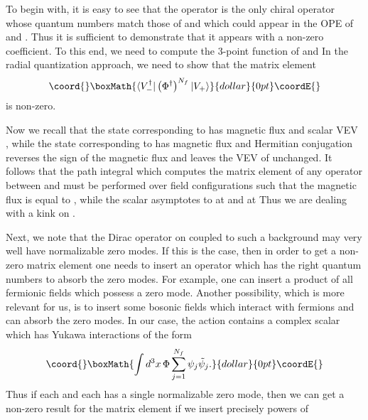 \documentclass[a4paper,12pt, amsfonts, amssymb]{article}
\providecommand{\RR}{{\mathbb R}}
\renewcommand{\SS}{{\mathbb S}}
\providecommand{\tpsi}{{\tilde \psi}}
\begin{document}
To begin with, it is easy to see that the operator \coordHE{} is the
only chiral operator whose quantum numbers match those of \coordHE{}
and which could appear in the OPE of \coordHE{} and \coordHE{}.
Thus it is sufficient to demonstrate that it appears with a non-zero
coefficient. To this end, we need to compute the 3-point function
of \coordHE{} and \coordHE{} In the radial
quantization approach, we need to show that the matrix element
$$\coord{}\boxMath{
\langle V_-^\dag \vert \left(\Phi^\dag\right)^{N_f} \vert V_+\rangle
}{dollar}{0pt}\coordE{}$$
is non-zero.

Now we recall that the state corresponding to \coordHE{} has magnetic flux
\coordHE{} and scalar VEV \coordHE{}, while the state corresponding to
\coordHE{} has magnetic flux \coordHE{} and \coordHE{}
Hermitian conjugation reverses the sign of the magnetic flux and leaves the 
VEV of \myHighlight{$\chi$}\coordHE{} unchanged. It follows that the path integral which computes
the matrix element of any operator between \coordHE{} and 
\coordHE{} must be performed over field configurations such
that the magnetic flux is equal to \coordHE{}, while the scalar \myHighlight{$\chi$}\coordHE{}
asymptotes to \coordHE{} at \myHighlight{$\tau=-\infty$}\coordHE{} and \coordHE{} at \coordHE{}
Thus we are dealing with a kink on \myHighlight{$\SS^2\times\RR$}\coordHE{}.

Next, we note that the Dirac operator on \myHighlight{$\SS^2\times\RR$}\coordHE{} coupled
to such a background may very well have normalizable zero modes. If this 
is the case, then in order to get a non-zero matrix element one needs
to insert an operator which has the right quantum numbers to absorb
the zero modes. For example, one can insert a product of all fermionic
fields which possess a zero mode. Another possibility, which is more
relevant for us, is to insert some bosonic fields which interact with fermions
and can absorb the zero modes. In our case, the action contains a complex 
scalar \myHighlight{$\Phi$}\coordHE{} which has Yukawa interactions of the form
$$\coord{}\boxMath{
\int d^3x\, \Phi\sum_{j=1}^{N_f} \psi_j\tpsi_j.
}{dollar}{0pt}\coordE{}$$
Thus if each \myHighlight{$\psi$}\coordHE{} and each \myHighlight{$\tpsi$}\coordHE{} has a single normalizable zero
mode, then we can get a non-zero result for the matrix element if we insert
precisely \coordHE{} powers of \coordHE{}
\end{document}
